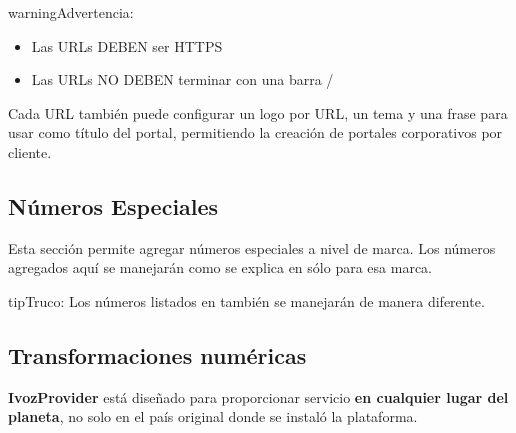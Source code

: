 \documentclass[letterpaper,10pt,spanish]{sphinxmanual}
\begin{document}
\begin{notice}{warning}{Advertencia:}\begin{itemize}
\item {} 
Las URLs DEBEN ser HTTPS

\item {} 
Las URLs NO DEBEN terminar con una barra /

\end{itemize}
\end{notice}

Cada URL también puede configurar un logo por URL, un tema y una frase para usar como título del portal, permitiendo la creación de portales corporativos por cliente.


\subsection{Números Especiales}
\label{administration_portal/brand/settings/special_numbers:special-numbers}\label{administration_portal/brand/settings/special_numbers::doc}\label{administration_portal/brand/settings/special_numbers:id1}
Esta sección permite agregar números especiales a nivel de marca. Los números agregados aquí se manejarán como se explica en {\hyperref[administration_portal/platform/global_special_numbers:global\string-special\string-numbers]{}} sólo para esa marca.

\begin{notice}{tip}{Truco:}
Los números listados en {\hyperref[administration_portal/platform/global_special_numbers:global\string-special\string-numbers]{}} también se manejarán de manera diferente.
\end{notice}
\label{administration_portal/brand/settings/numeric_transformations:transformations}\label{administration_portal/brand/settings/numeric_transformations:numeric-transformations}

\subsection{Transformaciones numéricas}
\label{administration_portal/brand/settings/numeric_transformations:transformaciones-numericas}\label{administration_portal/brand/settings/numeric_transformations:id1}\label{administration_portal/brand/settings/numeric_transformations::doc}\label{administration_portal/brand/settings/numeric_transformations:transformations}\label{administration_portal/brand/settings/numeric_transformations:numeric-transformations}
\textbf{IvozProvider} está diseñado para proporcionar servicio \textbf{en cualquier lugar del planeta}, no solo en el país original donde se instaló la plataforma.
\end{document}
